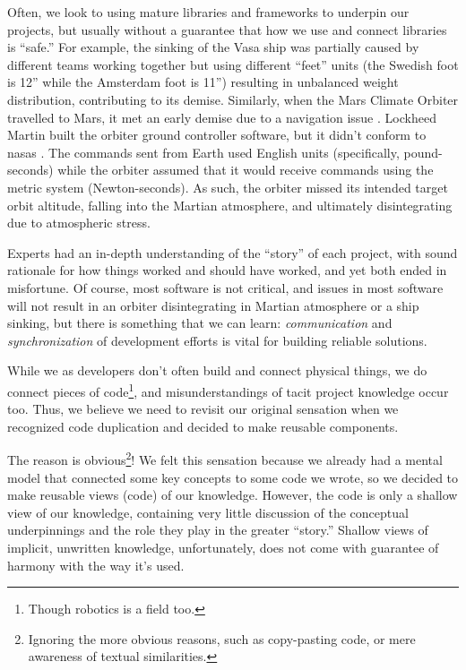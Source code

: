Often, we look to using mature libraries and frameworks to underpin our
projects, but usually without a guarantee that how we use and connect libraries
is ``safe.'' For example, the sinking of the Vasa ship \cite{wiki:Vasa_ship} was
partially caused by different teams working together but using different
``feet'' units (the Swedish foot is 12'' while the Amsterdam foot is 11'')
resulting in unbalanced weight distribution, contributing to its demise.
Similarly, when the Mars Climate Orbiter travelled to Mars, it met an early
demise due to a navigation issue \cite{Siddiqi2018}. Lockheed Martin built the
orbiter ground controller software, but it didn't conform to \acsp{nasa}
. The commands sent from Earth used English units (specifically,
pound-seconds) while the orbiter assumed that it would receive commands using
the metric system (Newton-seconds). As such, the orbiter missed its intended
target orbit altitude, falling into the Martian atmosphere, and ultimately
disintegrating due to atmospheric stress.

Experts had an in-depth understanding of the ``story'' of each project, with
sound rationale for how things worked and should have worked, and yet both
ended in misfortune. Of course, most software is not critical, and issues in
most software will not result in an orbiter disintegrating in Martian atmosphere
or a ship sinking, but there is something that we can learn:
\textit{communication} and \textit{synchronization} of development efforts is
vital for building reliable solutions.

While we as developers don't often build and connect physical things, we do
connect pieces of code\footnote{Though robotics is a field too.}, and
misunderstandings of tacit project knowledge occur too. Thus, we believe we need
to revisit our original sensation when we recognized code duplication and
decided to make reusable components.

The reason is obvious\footnote{Ignoring the more obvious reasons, such as
copy-pasting code, or mere awareness of textual similarities.}! We felt this
sensation because we already had a mental model that connected some key concepts
to some code we wrote, so we decided to make reusable views (code) of our
knowledge. However, the code is only a shallow view of our knowledge, containing
very little discussion of the conceptual underpinnings and the role they play in
the greater ``story.'' Shallow views of implicit, unwritten knowledge,
unfortunately, does not come with guarantee of harmony with the way it's used.

